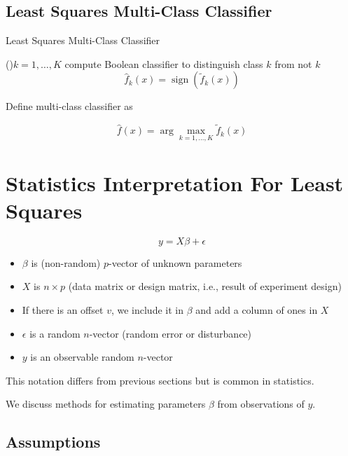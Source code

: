 \subsection{Least Squares Multi-Class Classifier}

\begin{algorithm}[htbp]
    \caption{Least Squares Multi-Class Classifier}
    \For(){$ k=1, \ldots, K $}{
        compute Boolean classifier to distinguish class $ k $ from not $ k $
$$
\hat{f}_{k}(x)=\operatorname{sign}\left(\tilde{f}_{k}(x)\right)
$$
    }
\end{algorithm}

Define multi-class classifier as

\begin{definition}
    $$
\hat{f}(x)=\arg \underset{k=1, \ldots, K}{\max} \tilde{f}_{k}(x)
$$
\end{definition}



\section{Statistics Interpretation For Least Squares}

\begin{problem}
    $$
y=X \beta+\epsilon
$$

\begin{itemize}
    \item $ \beta $ is (non-random) $ p $-vector of unknown parameters
    \item $ X $ is $ n \times p $ (data matrix or design matrix, i.e., result of experiment design)
    \item If there is an offset $ v $, we include it in $ \beta $ and add a column of ones in $ X $
    \item $ \epsilon $ is a random $ n $-vector (random error or disturbance)
    \item $ y $ is an observable random $ n $-vector
\end{itemize}
\end{problem}

\begin{remark}
    This notation differs from previous sections but is common in statistics.
\end{remark}

We discuss methods for estimating parameters $ \beta $ from observations of $ y $.

\subsection{Assumptions}

